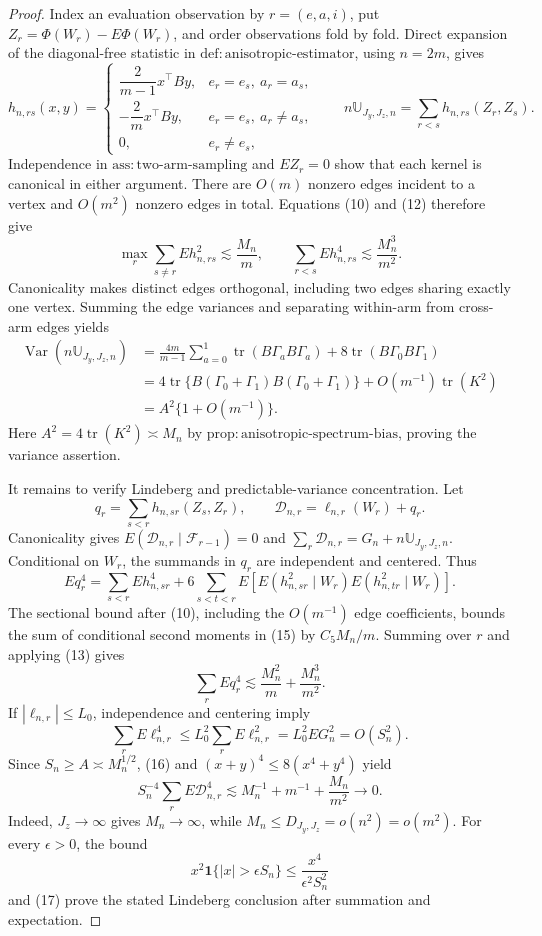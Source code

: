 \documentclass{article}
\begin{document}
\begin{proof}
Index an evaluation observation by \(r=(e,a,i)\), put \(Z_r=\Phi(W_r)-E\Phi(W_r)\), and order observations fold by fold. Direct expansion of the diagonal-free statistic in \(\mathrm{def{:}anisotropic\text{-}estimator}\), using \(n=2m\), gives
\[
h_{n,rs}(x,y)=
\begin{cases}
\dfrac{2}{m-1}x^{\top}By,&e_r=e_s,\ a_r=a_s,\\[4pt]
-\dfrac{2}{m}x^{\top}By,&e_r=e_s,\ a_r\ne a_s,\\[4pt]
0,&e_r\ne e_s,
\end{cases}
\qquad
n\mathbb U_{J_y,J_z,n}=\sum_{r<s}h_{n,rs}(Z_r,Z_s). \tag{12}
\]
Independence in \(\mathrm{ass{:}two\text{-}arm\text{-}sampling}\) and \(EZ_r=0\) show that each kernel is canonical in either argument. There are \(O(m)\) nonzero edges incident to a vertex and \(O(m^2)\) nonzero edges in total. Equations (10) and (12) therefore give
\[
\max_r\sum_{s\ne r}Eh_{n,rs}^2\lesssim\frac{M_n}{m},
\qquad
\sum_{r<s}Eh_{n,rs}^4\lesssim\frac{M_n^3}{m^2}. \tag{13}
\]
Canonicality makes distinct edges orthogonal, including two edges sharing exactly one vertex. Summing the edge variances and separating within-arm from cross-arm edges yields
\[
\begin{split}
\operatorname{Var}(n\mathbb U_{J_y,J_z,n})
&=\frac{4m}{m-1}\sum_{a=0}^1\operatorname{tr}(B\Gamma_aB\Gamma_a)
+8\operatorname{tr}(B\Gamma_0B\Gamma_1)\\
&=4\operatorname{tr}\{B(\Gamma_0+\Gamma_1)B(\Gamma_0+\Gamma_1)\}
+O(m^{-1})\operatorname{tr}(K^2)\\
&=A^2\{1+O(m^{-1})\}.
\end{split} \tag{14}
\]
Here \(A^2=4\operatorname{tr}(K^2)\asymp M_n\) by \(\mathrm{prop{:}anisotropic\text{-}spectrum\text{-}bias}\), proving the variance assertion.

It remains to verify Lindeberg and predictable-variance concentration. Let
\[
q_r=\sum_{s<r}h_{n,sr}(Z_s,Z_r),
\qquad
\mathcal D_{n,r}=\ell_{n,r}(W_r)+q_r.
\]
Canonicality gives \(E(\mathcal D_{n,r}\mid\mathcal F_{r-1})=0\) and \(\sum_r\mathcal D_{n,r}=G_n+n\mathbb U_{J_y,J_z,n}\). Conditional on \(W_r\), the summands in \(q_r\) are independent and centered. Thus
\[
Eq_r^4
=\sum_{s<r}Eh_{n,sr}^4
+6\sum_{s<t<r}E\!\left[E(h_{n,sr}^2\mid W_r)E(h_{n,tr}^2\mid W_r)\right]. \tag{15}
\]
The sectional bound after (10), including the \(O(m^{-1})\) edge coefficients, bounds the sum of conditional second moments in (15) by \(C_5M_n/m\). Summing over \(r\) and applying (13) gives
\[
\sum_rEq_r^4\lesssim\frac{M_n^2}{m}+\frac{M_n^3}{m^2}. \tag{16}
\]
If \(|\ell_{n,r}|\le L_0\), independence and centering imply
\[
\sum_rE\ell_{n,r}^4\le L_0^2\sum_rE\ell_{n,r}^2
=L_0^2EG_n^2=O(S_n^2).
\]
Since \(S_n\ge A\asymp M_n^{1/2}\), (16) and \((x+y)^4\le8(x^4+y^4)\) yield
\[
S_n^{-4}\sum_rE\mathcal D_{n,r}^4
\lesssim M_n^{-1}+m^{-1}+\frac{M_n}{m^2}\longrightarrow0. \tag{17}
\]
Indeed, \(J_z\to\infty\) gives \(M_n\to\infty\), while \(M_n\le D_{J_y,J_z}=o(n^2)=o(m^2)\). For every \(\epsilon>0\), the bound
\[
x^2\mathbf 1\{|x|>\epsilon S_n\}\le\frac{x^4}{\epsilon^2S_n^2}
\]
and (17) prove the stated Lindeberg conclusion after summation and expectation.


\end{proof}
\end{document}
